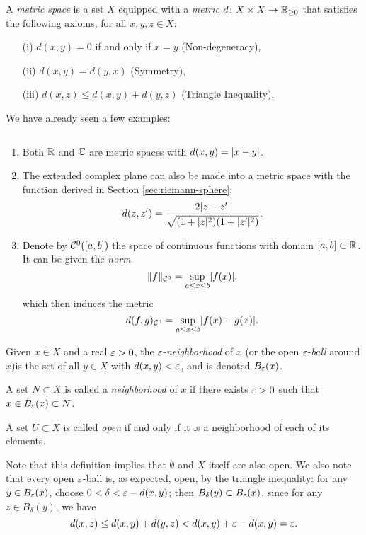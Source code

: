 \begin{definition}
	A \emph{metric space} is a set $X$ equipped with a \emph{metric} $d \colon X \times X \rightarrow \mathbb R_{\ge 0}$ that satisfies the following axioms, for all $x,y,z \in X$:
	\begin{enumerate}
		\item[(i)] $d(x,y)=0$ if and only if $x=y$ (Non-degeneracy),
		\item[(ii)] $d(x,y)=d(y,x)$ (Symmetry),
		\item[(iii)] $d(x,z) \le d(x,y)+d(y,z)$ (Triangle Inequality).
		\end{enumerate}
\end{definition}
We have already seen a few examples:
\begin{example}
	$ $
	\begin{enumerate}
		\item Both $\mathbb R$ and $\mathbb C$ are metric spaces with $d(x,y)=\lvert x-y \rvert$.
		
		\item The extended complex plane can also be made into a metric space with the function derived in Section \ref{sec:riemann-sphere}: $$d(z,z')=\dfrac{2\lvert z-z' \rvert}{\sqrt{(1+\lvert z \rvert^2)(1+\lvert z' \rvert^2)}}.$$
		
		\item Denote by $\mathcal{C}^0([a,b])$ the space of continuous functions with domain $[a,b] \subset \mathbb R$. It can be given the \emph{norm} $$\Vert f \Vert_{\mathcal{C}^0}=\sup_{a \le x \le b}\lvert f(x) \rvert,$$ which then induces the metric $$d(f,g)_{\mathcal{C}^0}=\sup_{a \le x \le b}\lvert f(x)-g(x) \rvert.$$
	\end{enumerate}
\end{example}

\begin{definition}
	Given $x \in X$ and a real $\varepsilon>0$, the $\varepsilon$-\emph{neighborhood} of $x$ (or the open $\varepsilon$-\emph{ball} around $x$)is the set of all $y \in X$ with $d(x,y)<\varepsilon$, and is denoted $B_{\varepsilon}(x)$.
	
	A set $N \subset X$ is called a \emph{neighborhood} of $x$ if there exists $\varepsilon>0$ such that $x \in B_{\varepsilon}(x) \subset N$.
\end{definition}

\begin{definition}
	A set $U \subset X$ is called \emph{open} if and only if it is a neighborhood of each of its elements.
\end{definition}

Note that this definition implies that $\emptyset$ and $X$ itself are also open. We also note that every open $\varepsilon$-ball is, as expected, open, by the triangle inequality: for any $y \in B_{\varepsilon}(x)$, choose $0<\delta<\varepsilon-d(x,y)$; then $B_{\delta}(y) \subset B_{\varepsilon}(x)$, since for any $z \in B_{\delta}(y)$, we have $$d(x,z) \le d(x,y)+d(y,z)<d(x,y)+\varepsilon-d(x,y)=\varepsilon.$$

